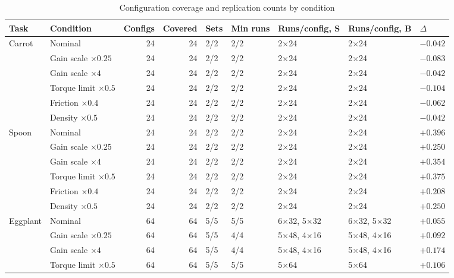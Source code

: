 \documentclass[pdflatex,iicol,sn-apa]{sn-jnl}
\theoremstyle{remark}
\begin{document}
\begin{appendices}
\begin{table}[t]
\caption{Configuration coverage and replication counts by condition}\label{tabC1}
\centering
\small
\setlength{\tabcolsep}{4pt}
\begin{tabular}{@{}llrrl@{\hspace{1.5em}}llll@{}}
\toprule
Task & Condition & Configs & Covered & Sets & Min runs & Runs/config, S & Runs/config, B & $\Delta$ \\
\midrule
Carrot & Nominal & 24 & 24 & 2/2 & 2/2 & 2$\times$24 & 2$\times$24 & $-0.042$ \\
 & Gain scale $\times0.25$ & 24 & 24 & 2/2 & 2/2 & 2$\times$24 & 2$\times$24 & $-0.083$ \\
 & Gain scale $\times4$ & 24 & 24 & 2/2 & 2/2 & 2$\times$24 & 2$\times$24 & $-0.042$ \\
 & Torque limit $\times0.5$ & 24 & 24 & 2/2 & 2/2 & 2$\times$24 & 2$\times$24 & $-0.104$ \\
 & Friction $\times0.4$ & 24 & 24 & 2/2 & 2/2 & 2$\times$24 & 2$\times$24 & $-0.062$ \\
 & Density $\times0.5$ & 24 & 24 & 2/2 & 2/2 & 2$\times$24 & 2$\times$24 & $-0.042$ \\
\midrule
Spoon & Nominal & 24 & 24 & 2/2 & 2/2 & 2$\times$24 & 2$\times$24 & $+0.396$ \\
 & Gain scale $\times0.25$ & 24 & 24 & 2/2 & 2/2 & 2$\times$24 & 2$\times$24 & $+0.250$ \\
 & Gain scale $\times4$ & 24 & 24 & 2/2 & 2/2 & 2$\times$24 & 2$\times$24 & $+0.354$ \\
 & Torque limit $\times0.5$ & 24 & 24 & 2/2 & 2/2 & 2$\times$24 & 2$\times$24 & $+0.375$ \\
 & Friction $\times0.4$ & 24 & 24 & 2/2 & 2/2 & 2$\times$24 & 2$\times$24 & $+0.208$ \\
 & Density $\times0.5$ & 24 & 24 & 2/2 & 2/2 & 2$\times$24 & 2$\times$24 & $+0.250$ \\
\midrule
Eggplant & Nominal & 64 & 64 & 5/5 & 5/5 & 6$\times$32, 5$\times$32 & 6$\times$32, 5$\times$32 & $+0.055$ \\
 & Gain scale $\times0.25$ & 64 & 64 & 5/5 & 4/4 & 5$\times$48, 4$\times$16 & 5$\times$48, 4$\times$16 & $+0.092$ \\
 & Gain scale $\times4$ & 64 & 64 & 5/5 & 4/4 & 5$\times$48, 4$\times$16 & 5$\times$48, 4$\times$16 & $+0.174$ \\
 & Torque limit $\times0.5$ & 64 & 64 & 5/5 & 5/5 & 5$\times$64 & 5$\times$64 & $+0.106$ \\

\end{tabular}
\end{table}
\end{appendices}
\end{document}
